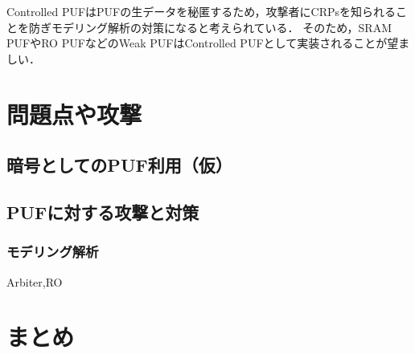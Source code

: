 \documentclass[technicalreport]{ieicej} %
\begin{document}
Controlled PUFはPUFの生データを秘匿するため，攻撃者にCRPsを知られることを防ぎモデリング解析の対策になると考えられている．
そのため，SRAM PUFやRO PUFなどのWeak PUFはControlled PUFとして実装されることが望ましい．
\section{問題点や攻撃}
\subsection{暗号としてのPUF利用（仮）}

\subsection{PUFに対する攻撃と対策}
\subsubsection{モデリング解析}
Arbiter,RO
\section{まとめ}

\end{document}
